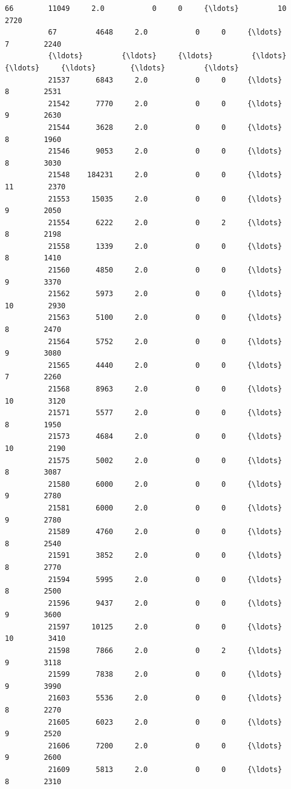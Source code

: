 \documentclass[11pt]{article}
\begin{document}
\begin{Verbatim}[commandchars=\\\{\}]
          66        11049     2.0           0     0     {\ldots}         10        2720   
          67         4648     2.0           0     0     {\ldots}          7        2240   
          {\ldots}         {\ldots}     {\ldots}         {\ldots}   {\ldots}     {\ldots}        {\ldots}         {\ldots}   
          21537      6843     2.0           0     0     {\ldots}          8        2531   
          21542      7770     2.0           0     0     {\ldots}          9        2630   
          21544      3628     2.0           0     0     {\ldots}          8        1960   
          21546      9053     2.0           0     0     {\ldots}          8        3030   
          21548    184231     2.0           0     0     {\ldots}         11        2370   
          21553     15035     2.0           0     0     {\ldots}          9        2050   
          21554      6222     2.0           0     2     {\ldots}          8        2198   
          21558      1339     2.0           0     0     {\ldots}          8        1410   
          21560      4850     2.0           0     0     {\ldots}          9        3370   
          21562      5973     2.0           0     0     {\ldots}         10        2930   
          21563      5100     2.0           0     0     {\ldots}          8        2470   
          21564      5752     2.0           0     0     {\ldots}          9        3080   
          21565      4440     2.0           0     0     {\ldots}          7        2260   
          21568      8963     2.0           0     0     {\ldots}         10        3120   
          21571      5577     2.0           0     0     {\ldots}          8        1950   
          21573      4684     2.0           0     0     {\ldots}         10        2190   
          21575      5002     2.0           0     0     {\ldots}          8        3087   
          21580      6000     2.0           0     0     {\ldots}          9        2780   
          21581      6000     2.0           0     0     {\ldots}          9        2780   
          21589      4760     2.0           0     0     {\ldots}          8        2540   
          21591      3852     2.0           0     0     {\ldots}          8        2770   
          21594      5995     2.0           0     0     {\ldots}          8        2500   
          21596      9437     2.0           0     0     {\ldots}          9        3600   
          21597     10125     2.0           0     0     {\ldots}         10        3410   
          21598      7866     2.0           0     2     {\ldots}          9        3118   
          21599      7838     2.0           0     0     {\ldots}          9        3990   
          21603      5536     2.0           0     0     {\ldots}          8        2270   
          21605      6023     2.0           0     0     {\ldots}          9        2520   
          21606      7200     2.0           0     0     {\ldots}          9        2600   
          21609      5813     2.0           0     0     {\ldots}          8        2310   
          

\end{Verbatim}
\end{document}
